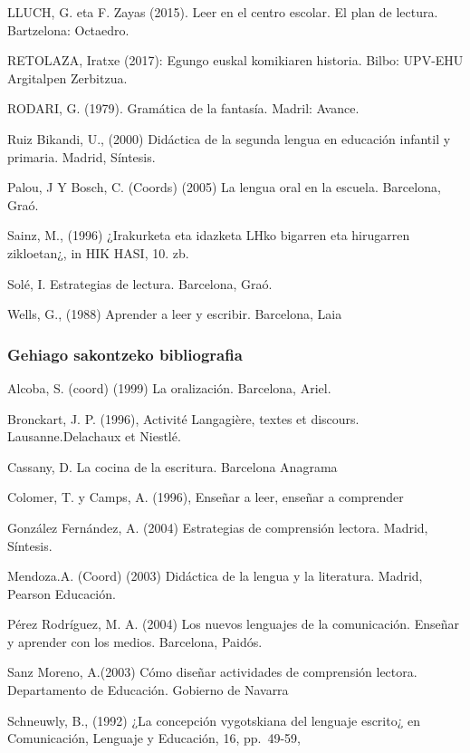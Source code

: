 \documentclass[
]{book}
\begin{document}
LLUCH, G. eta F. Zayas (2015). Leer en el centro escolar. El plan de lectura. Bartzelona: Octaedro.

RETOLAZA, Iratxe (2017): Egungo euskal komikiaren historia. Bilbo: UPV-EHU Argitalpen Zerbitzua.

RODARI, G. (1979). Gramática de la fantasía. Madril: Avance.

Ruiz Bikandi, U., (2000) Didáctica de la segunda lengua en educación infantil y primaria. Madrid, Síntesis.

Palou, J Y Bosch, C. (Coords) (2005) La lengua oral en la escuela. Barcelona, Graó.

Sainz, M., (1996) ¿Irakurketa eta idazketa LHko bigarren eta hirugarren zikloetan¿, in HIK HASI, 10. zb.

Solé, I. Estrategias de lectura. Barcelona, Graó.

Wells, G., (1988) Aprender a leer y escribir. Barcelona, Laia

\hypertarget{gehiago-sakontzeko-bibliografia}{%
\subsubsection*{Gehiago sakontzeko bibliografia}\label{gehiago-sakontzeko-bibliografia}}

Alcoba, S. (coord) (1999) La oralización. Barcelona, Ariel.

Bronckart, J. P. (1996), Activité Langagière, textes et discours. Lausanne.Delachaux et Niestlé.

Cassany, D. La cocina de la escritura. Barcelona Anagrama

Colomer, T. y Camps, A. (1996), Enseñar a leer, enseñar a comprender

González Fernández, A. (2004) Estrategias de comprensión lectora. Madrid, Síntesis.

Mendoza.A. (Coord) (2003) Didáctica de la lengua y la literatura. Madrid, Pearson Educación.

Pérez Rodríguez, M. A. (2004) Los nuevos lenguajes de la comunicación. Enseñar y aprender con los medios. Barcelona, Paidós.

Sanz Moreno, A.(2003) Cómo diseñar actividades de comprensión lectora. Departamento de Educación. Gobierno de Navarra

Schneuwly, B., (1992) ¿La concepción vygotskiana del lenguaje escrito¿ en Comunicación, Lenguaje y Educación, 16, pp.~49-59,
\end{document}
